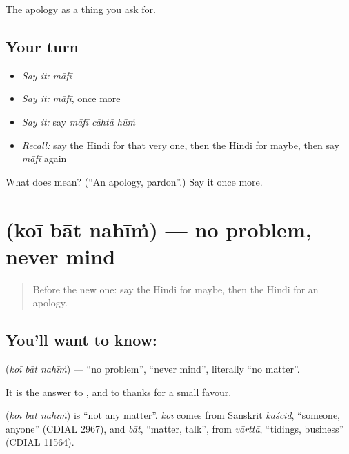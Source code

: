\begin{grammarlens}[title={What you've built}]
The apology as a thing you ask for.
\end{grammarlens}

\subsection*{Your turn}
\begin{itemize}
\raggedright
  \item \emph{Say it:} \emph{māfī}
  \item \emph{Say it:} \emph{māfī}, once more
  \item \emph{Say it:} say \emph{māfī cāhtā hūṁ}
  \item \emph{Recall:} say the Hindi for that very one, then the Hindi for maybe, then say \emph{māfī} again
\end{itemize}

\begin{tcolorbox}[breakable,colback=teal!4,colframe=teal!35!black,title={Before you move on}]
What does  mean? (\textquotedblleft{}An apology, pardon\textquotedblright{}.) Say it once more.
\end{tcolorbox}
\section[\texorpdfstring{\hi{कोई} \hi{बात} \hi{नहीं} (koī bāt nahīṁ)}{कोई बात नहीं (koī bāt nahīṁ)}]{   (koī bāt nahīṁ) — no problem, never mind}

\label{lesson:HI-C114-koibaat}



\begin{quote}
Before the new one: say the Hindi for maybe, then the Hindi for an apology.
\end{quote}

\subsection*{You'll want to know:   }
\textbf{  } (\emph{koī bāt nahīṁ}) — \textquotedblleft{}no problem\textquotedblright{}, \textquotedblleft{}never mind\textquotedblright{}, literally \textquotedblleft{}no matter\textquotedblright{}.

It is the answer to \textbf{ }, and to thanks for a small favour.

\begin{cousinweb}
\textbf{  } (\emph{koī bāt nahīṁ}) is \textquotedblleft{}not any matter\textquotedblright{}. \emph{koī} comes from Sanskrit \emph{kaścid}, \textquotedblleft{}someone, anyone\textquotedblright{} (CDIAL 2967), and \emph{bāt}, \textquotedblleft{}matter, talk\textquotedblright{}, from \emph{vārttā}, \textquotedblleft{}tidings, business\textquotedblright{} (CDIAL 11564).
\end{cousinweb}

